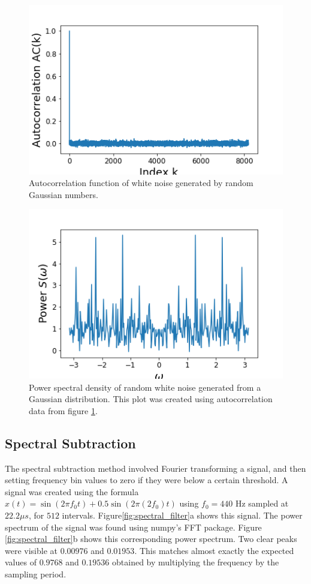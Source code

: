 \documentclass[twocolumn]{article}
\begin{document}
\begin{figure}[t]
\centering
\includegraphics[width=\linewidth]{GaussianAC}
\caption{Autocorrelation function of white noise generated by random Gaussian numbers.}
\label{fig:GaussianAC}
\end{figure}

\begin{figure}
\centering
\includegraphics[width=\linewidth]{GaussianS}
\caption{Power spectral density of random white noise generated from a Gaussian distribution. This plot was created using autocorrelation data from figure \ref{fig:GaussianAC}.}
\label{fig:GaussianS}
\end{figure}


\subsection{Spectral Subtraction}
The spectral subtraction method involved Fourier transforming a signal, and then setting frequency bin values to zero if they were below a certain threshold. A signal was created using the formula $ x(t) = \sin (2\pi f_0t) + 0.5\sin (2\pi (2f_0)t)$ using $f_0=440$ Hz sampled at $22.2\mu s$, for $512$ intervals. Figure\ref{fig:spectral_filter}a shows this signal. The power spectrum of the signal was found using numpy's FFT package. Figure \ref{fig:spectral_filter}b shows this corresponding power spectrum. Two clear peaks were visible at $0.00976$ and $0.01953$. This matches almost exactly the expected values of $0.9768$ and $0.19536$ obtained by multiplying the frequency by the sampling period.
\end{document}
